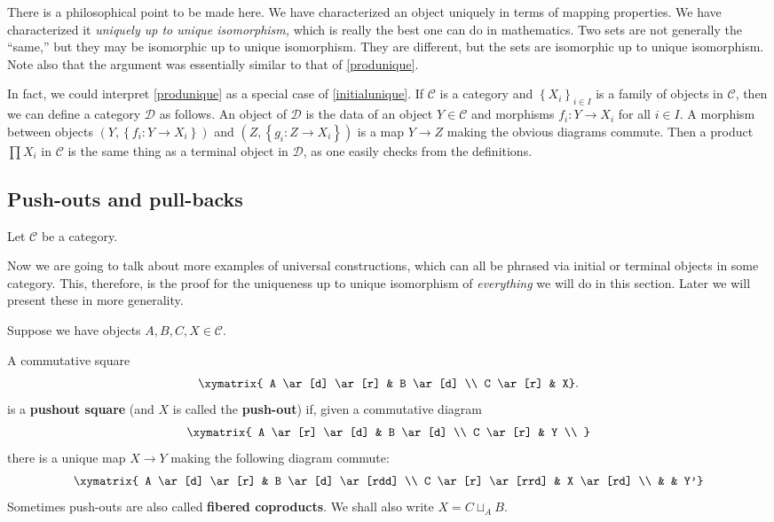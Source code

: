 There is a philosophical point to be made here. We have characterized an object
uniquely in terms of mapping properties. We have characterized it
\emph{uniquely up to unique isomorphism,} which is really the best one can do
in mathematics. Two sets are not generally the ``same,'' but they may be
isomorphic up to unique isomorphism. They are different,
but the sets are isomorphic up
to unique isomorphism.
Note also that the argument was essentially similar to that of \cref{produnique}.

In fact, we could interpret  \cref{produnique} as a special case of
\cref{initialunique}.
If $\mathcal{C}$ is a category and $\left\{X_i\right\}_{i \in I}$ is a family
of objects in $\mathcal{C}$, then we can define a category $\mathcal{D}$ as
follows. An object of $\mathcal{D}$ is the data of an object $Y \in
\mathcal{C}$ and morphisms $f_i: Y \to X_i$ for all $i \in I$. 
A morphism between objects $(Y, \left\{f_i: Y \to X_i\right\})$ and $(Z,
\left\{g_i: Z \to X_i\right\})$ is 
a map $Y \to Z$ making the obvious diagrams commute. Then a product $\prod X_i$
in $\mathcal{C}$ is the same thing as a terminal object in $\mathcal{D}$, as
one easily checks from the definitions. 

\subsection{Push-outs and pull-backs}

Let $\mathcal{C}$ be a category.

Now we are going to talk about more  examples of universal constructions, which can all be
phrased via initial or terminal objects in some category. This,
therefore, is the proof for the uniqueness up to unique
isomorphism of \emph{everything} we will do in this
section. Later we will present these in more generality.


Suppose we have objects $A, B, C, X \in \mathcal{C}$. 

\begin{definition}
A commutative square 
\[
\xymatrix{
A \ar[d] \ar[r] &  B \ar[d] \\
C \ar[r] &  X}.
\]
is a \textbf{pushout square} (and $X$ is called the \textbf{push-out}) if,
given a commutative diagram
\[ \xymatrix{
A \ar[r] \ar[d]  &  B \ar[d] \\
C \ar[r] & Y  \\
}\]
there is a unique map $X \to Y$ making the following diagram commute:
\[
\xymatrix{
A \ar[d] \ar[r] &  B \ar[d] \ar[rdd] \\
C \ar[r] \ar[rrd] &  X \ar[rd] \\
& & Y'}
\]
Sometimes push-outs are also called \textbf{fibered coproducts}.
We shall also write $X = C \sqcup_A B$.
\end{definition}

